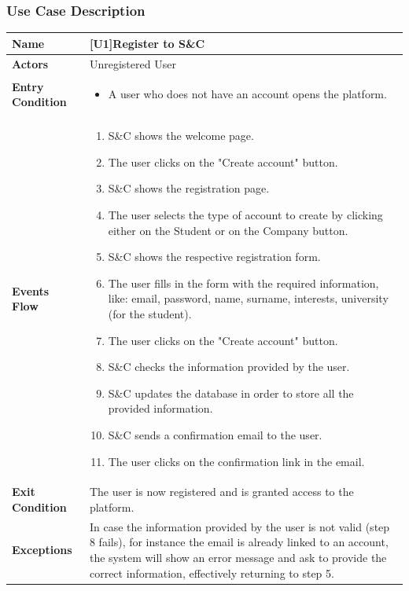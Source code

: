 \subsubsection{Use Case Description}
\begin{center}
    \begin{tabular}{|p{9em}|p{27em}|}
        \hline
        \rowcolor{bluepoli!40}
        \textbf{Name} & \textbf{[U1]Register to S\&C} \\
        \hline
        \textbf{Actors} & Unregistered User \\
        \hline
        \textbf{Entry Condition} & 
            \begin{itemize}
                \item A user who does not have an account opens the platform. 
            \end{itemize} \\
        \hline
        \textbf{Events Flow} & 
        \begin{enumerate}
            \item S\&C shows the welcome page.
            \item The user clicks on the "Create account" button.
            \item S\&C shows the registration page.
            \item The user selects the type of account to create by clicking either on the Student or on the Company button.
            \item S\&C shows the respective registration form.
            \item The user fills in the form with the required information, like: email, password, name, surname, interests, university (for the student).
            \item The user clicks on the "Create account" button.
            \item S\&C checks the information provided by the user.
            \item S\&C updates the database in order to store all the provided information.
            \item S\&C sends a confirmation email to the user.
            \item The user clicks on the confirmation link in the email.
        \end{enumerate} \\
        \hline
        \textbf{Exit Condition} & The user is now registered and is granted access to the platform. \\
        \hline
        \textbf{Exceptions} & In case the information provided by the user is not valid (step 8 fails), for instance the email is already linked to 
        an account, the system will show an error message and ask to provide the correct information, effectively returning to step 5. \\
        \hline
    \end{tabular}
\end{center}

